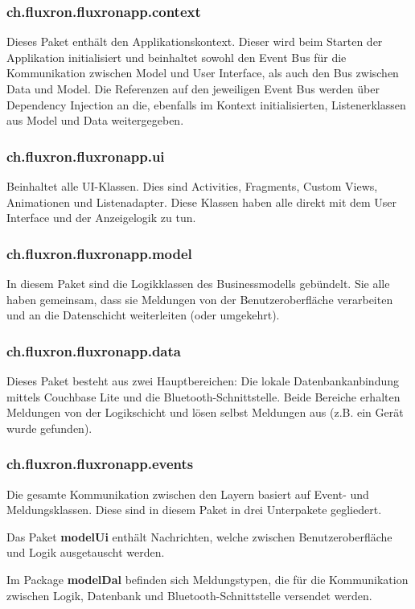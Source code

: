 \subsubsection{ch.fluxron.fluxronapp.context}
Dieses Paket enthält den Applikationskontext. Dieser wird beim Starten der Applikation initialisiert und beinhaltet sowohl den Event Bus für die Kommunikation zwischen Model und User Interface, als auch den Bus zwischen Data und Model. Die Referenzen auf den jeweiligen Event Bus werden über Dependency Injection an die, ebenfalls im Kontext initialisierten, Listenerklassen aus Model und Data weitergegeben.

\subsubsection{ch.fluxron.fluxronapp.ui}
Beinhaltet alle UI-Klassen. Dies sind Activities, Fragments, Custom Views, Animationen und Listenadapter. Diese Klassen haben alle direkt mit dem User Interface und der Anzeigelogik zu tun.

\subsubsection{ch.fluxron.fluxronapp.model}
In diesem Paket sind die Logikklassen des Businessmodells gebündelt. Sie alle haben gemeinsam, dass sie Meldungen von der Benutzeroberfläche verarbeiten und an die Datenschicht weiterleiten (oder umgekehrt).

\subsubsection{ch.fluxron.fluxronapp.data}
Dieses Paket besteht aus zwei Hauptbereichen: Die lokale Datenbankanbindung mittels Couchbase Lite und die Bluetooth-Schnittstelle. Beide Bereiche erhalten Meldungen von der Logikschicht und lösen selbst Meldungen aus (z.B. ein Gerät wurde gefunden).

\subsubsection{ch.fluxron.fluxronapp.events}
Die gesamte Kommunikation zwischen den Layern basiert auf Event- und Meldungsklassen. Diese sind in diesem Paket in drei Unterpakete gegliedert.

Das Paket \textbf{modelUi} enthält Nachrichten, welche zwischen Benutzeroberfläche und Logik ausgetauscht werden.

Im Package \textbf{modelDal} befinden sich Meldungstypen, die für die Kommunikation zwischen Logik, Datenbank und Bluetooth-Schnittstelle versendet werden.

